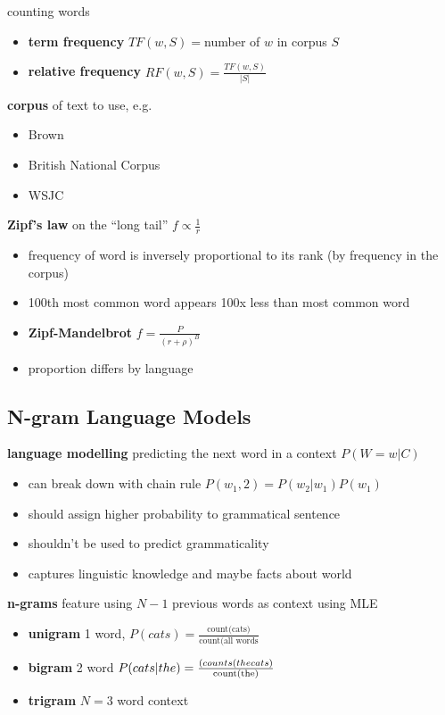 \documentclass[]{article}
\theoremstyle{definition}
\begin{document}
counting words
\begin{itemize}
    \item \textbf{term frequency} $TF(w,S) = $number of $w$ in corpus $S$
    \item \textbf{relative frequency} $RF(w,S) = \frac{TF(w,S)}{|S|}$
\end{itemize}

\textbf{corpus} of text to use, e.g.
\begin{itemize}
    \item Brown
    \item British National Corpus
    \item WSJC
\end{itemize}

\textbf{Zipf's law} on the ``long tail'' $f \propto \frac{1}{r}$
\begin{itemize}
    \item frequency of  word is inversely proportional to its rank (by frequency in the corpus)
    \item 100th most common word appears 100x less than most common word
    \item \textbf{Zipf-Mandelbrot} $f = \frac{P}{(r + \rho)^B}$
    \item proportion differs by language
\end{itemize}


\subsection{N-gram Language Models}%
\label{sub:ngram_language_models}

\textbf{language modelling} predicting the next word in a context $P(W = w| C)$
\begin{itemize}
    \item can break down with chain rule $P(w_1,2) = P(w_2|w_1)P(w_1)$
    \item should assign higher probability to grammatical sentence
    \item shouldn't be used to predict grammaticality
    \item captures linguistic knowledge and maybe facts about world
\end{itemize}

\textbf{n-grams} feature using $N-1$ previous words as context using MLE
\begin{itemize}
    \item \textbf{unigram} 1 word, $P(cats) = \frac{\text{count(cats)}}{\text{count(all words}}$
    \item \textbf{bigram} 2 word $P(cats | the) = \frac{\text(counts(the cats)}{\text{count(the)}}$
    \item \textbf{trigram} $N=3$ word context
\end{itemize}
\end{document}
